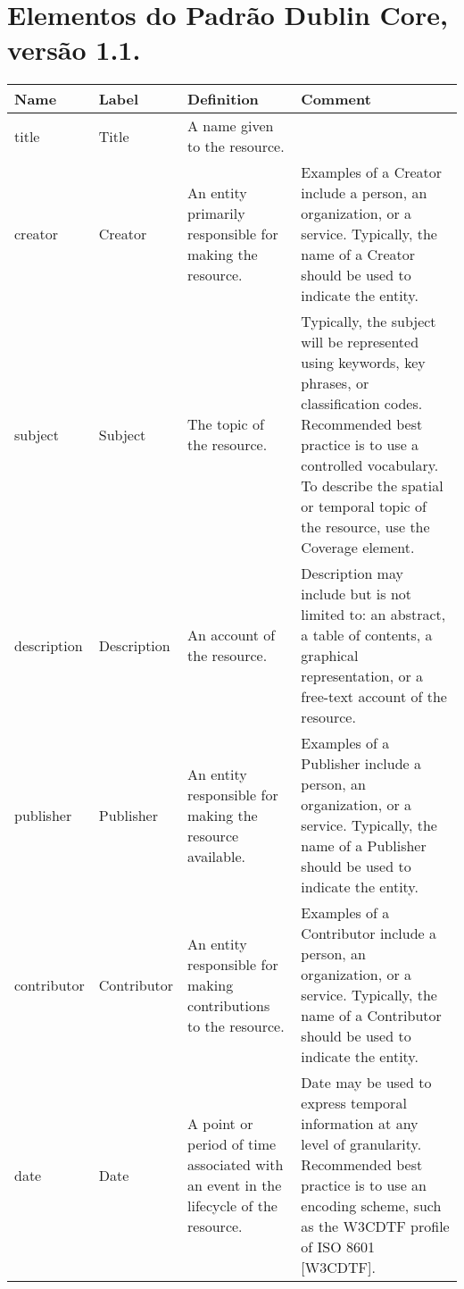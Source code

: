 
\chapter{Elementos do Padrão Dublin Core, versão 1.1.}
\label{attach:dublin-core}

\begin{flushleft}

    \begin{longtable}{|p{2cm}|p{2cm}|p{4cm}|p{6cm}|}
        \hline \textbf{Name} & \textbf{Label} & \textbf{Definition} & \textbf{Comment}\\ 
        \hline title & Title & A name given to the resource. & \\
        \hline creator & Creator & An entity primarily responsible for making the resource. & Examples of a Creator include a person, an organization, or a service.  Typically, the name of a Creator should be used to indicate the entity.\\
        \hline subject & Subject & The topic of the resource. & Typically, the subject will be represented using keywords, key phrases, or classification codes. Recommended best practice is to use a controlled vocabulary. To describe the spatial or temporal topic of the resource, use the Coverage element.\\
        \hline description & Description & An account of the resource. & Description may include but is not limited to: an abstract, a table of contents, a graphical representation, or a free-text account of the resource.\\
        \hline publisher & Publisher & An entity responsible for making the resource available. & Examples of a Publisher include a person, an organization, or a service.  Typically, the name of a Publisher should be used to indicate the entity.\\
        \hline contributor & Contributor & An entity responsible for making contributions to the resource. & Examples of a Contributor include a person, an organization, or a service. Typically, the name of a Contributor should be used to indicate the entity.\\
        \hline date & Date & A point or period of time associated with an event in the lifecycle of the resource. & Date may be used to express temporal information at any level of granularity.  Recommended best practice is to use an encoding scheme, such as the W3CDTF profile of ISO 8601 [W3CDTF].\\

\end{longtable}
\end{flushleft}
